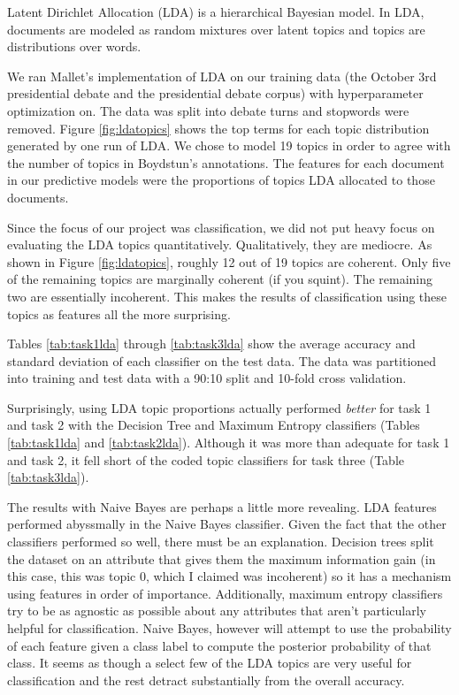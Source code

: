 
Latent Dirichlet Allocation (LDA) is a hierarchical Bayesian model.
In LDA, documents are modeled as random mixtures over latent topics and topics are distributions over words.

We ran Mallet's implementation of LDA on our training data (the October 3rd presidential debate and the presidential debate corpus) with hyperparameter optimization on.
The data was split into debate turns and stopwords were removed.
Figure \ref{fig:ldatopics} shows the top terms for each topic distribution generated by one run of LDA.
We chose to model 19 topics in order to agree with the number of topics in Boydstun's annotations.
The features for each document in our predictive models were the proportions of topics LDA allocated to those documents.

Since the focus of our project was classification, we did not put heavy focus on evaluating the LDA topics quantitatively.
Qualitatively, they are mediocre.
As shown in Figure \ref{fig:ldatopics}, roughly 12 out of 19 topics are coherent.
Only five of the remaining topics are marginally coherent (if you squint).
The remaining two are essentially incoherent.
This makes the results of classification using these topics as features all the more surprising.

Tables \ref{tab:task1lda} through \ref{tab:task3lda} show the average accuracy and standard deviation of each classifier on the test data.
The data was partitioned into training and test data with a 90:10 split and 10-fold cross validation.

Surprisingly, using LDA topic proportions actually performed \textit{better} for task 1 and task 2 with the Decision Tree and Maximum Entropy classifiers (Tables \ref{tab:task1lda} and \ref{tab:task2lda}).
Although it was more than adequate for task 1 and task 2, it fell short of the coded topic classifiers for task three (Table \ref{tab:task3lda}).

The results with Naive Bayes are perhaps a little more revealing.
LDA features performed abyssmally in the Naive Bayes classifier.
Given the fact that the other classifiers performed so well, there must be an explanation.
Decision trees split the dataset on an attribute that gives them the maximum information gain (in this case, this was topic 0, which I claimed was incoherent) so it has a mechanism using features in order of importance.
Additionally, maximum entropy classifiers try to be as agnostic as possible about any attributes that aren't particularly helpful for classification.
Naive Bayes, however will attempt to use the probability of each feature given a class label to compute the posterior probability of that class.
It seems as though a select few of the LDA topics are very useful for classification and the rest detract substantially from the overall accuracy.

